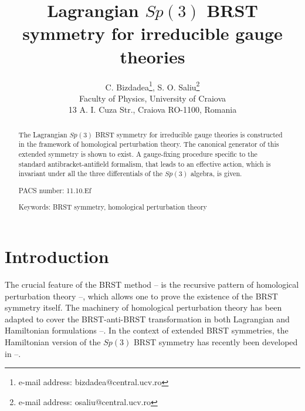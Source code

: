 \documentclass[a4paper,12pt]{article}
\begin{document}
\author{C. Bizdadea\thanks{%
e-mail address: bizdadea@central.ucv.ro}, S. O. Saliu\thanks{%
e-mail address: osaliu@central.ucv.ro} \\
Faculty of Physics, University of Craiova\\
13 A. I. Cuza Str., Craiova RO-1100, Romania}
\title{Lagrangian $Sp(3)$ BRST symmetry for irreducible gauge theories}
\maketitle

\begin{abstract}
The Lagrangian $Sp(3)$ BRST symmetry for irreducible gauge theories is
constructed in the framework of homological perturbation theory. The
canonical generator of this extended symmetry is shown to exist. A
gauge-fixing procedure specific to the standard antibracket-antifield
formalism, that leads to an effective action, which is invariant under all
the three differentials of the $Sp(3)$ algebra, is given.

PACS number: 11.10.Ef

Keywords: BRST symmetry, homological perturbation theory
\end{abstract}

\section{Introduction}

The crucial feature of the BRST method \cite{1}--\cite{12} is the recursive
pattern of homological perturbation theory \cite{13}--\cite{19}, which
allows one to prove the existence of the BRST symmetry itself. The machinery
of homological perturbation theory has been adapted to cover the
BRST-anti-BRST transformation in both Lagrangian and Hamiltonian
formulations \cite{20}--\cite{37}. In the context of extended BRST
symmetries, the Hamiltonian version of the $Sp(3)$ BRST symmetry has
recently been developed in \cite{38}--\cite{40}.
\end{document}
